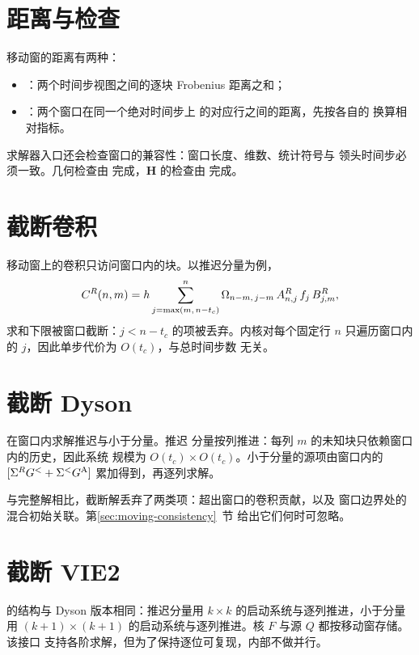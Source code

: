 \section{距离与检查}
\label{sec:moving-checks}

移动窗的距离有两种：
\begin{itemize}
    \item {}：两个时间步视图之间的逐块
          Frobenius 距离之和；
    \item {}：两个窗口在同一个绝对时间步上
          的对应行之间的距离，先按各自的  换算相对指标。
\end{itemize}
求解器入口还会检查窗口的兼容性：窗口长度、维数、统计符号与
领头时间步必须一致。几何检查由
 完成，$\bm{H}$ 的检查由
 完成。

\section{截断卷积}
\label{sec:moving-convolution}

移动窗上的卷积只访问窗口内的块。以推迟分量为例，
\begin{equation}
    C^{R}(n,m)
    =
    h\sum^{n}_{j=\max(m,\,n-t_c)}
      \Omega_{n-m,\,j-m}\,
      A^{R}_{n,j}\,f_j\,B^{R}_{j,m},
\end{equation}
求和下限被窗口截断：$j<n-t_c$ 的项被丢弃。内核对每个固定行
$n$ 只遍历窗口内的 $j$，因此单步代价为 $O(t_c)$，与总时间步数
无关。

\section{截断 Dyson}
\label{sec:moving-dyson}

 在窗口内求解推迟与小于分量。推迟
分量按列推进：每列 $m$ 的未知块只依赖窗口内的历史，因此系统
规模为 $O(t_c)\times O(t_c)$。小于分量的源项由窗口内的
$[\Sigma^{R}G^{<}+\Sigma^{<}G^{\mathrm{A}}]$ 累加得到，再逐列求解。

与完整解相比，截断解丢弃了两类项：超出窗口的卷积贡献，以及
窗口边界处的混合初始关联。第\ref{sec:moving-consistency}~节
给出它们何时可忽略。

\section{截断 VIE2}
\label{sec:moving-vie2}

 的结构与 Dyson 版本相同：推迟分量用
$k\times k$ 的启动系统与逐列推进，小于分量用 $(k+1)\times(k+1)$
的启动系统与逐列推进。核 $F$ 与源 $Q$ 都按移动窗存储。该接口
支持各阶求解，但为了保持逐位可复现，内部不做并行。

